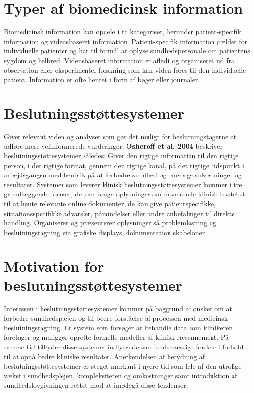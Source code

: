 \section{Typer af biomedicinsk information}
Biomedicinsk information kan opdele i to kategoriser, herunder patient-specifik information og vidensbaseret information. Patient-specifik information gælder for individuelle patienter og har til formål at oplyse sundhedspersonale om patientens sygdom og helbred. Vidensbaseret information er afledt og organiseret ud fra observation eller eksperimentel forskning som kan viden føres til den individuelle patient. Information er ofte hentet i form af bøger eller journaler.  

\section{Beslutningsstøttesystemer}
Giver relevant viden og analyser som gør det muligt for beslutningstagerne at udføre mere velinformerede vurderinger. \textbf{Osheroff et al. 2004} beskriver beslutningsstøttesystemer således: Giver den rigtige information til den rigtige person, i det rigtige format, gennem den rigtige kanal, på det rigtige tidspunkt i arbejdsgangen med henblik på at forbedre sundhed og omsorgsomkostninger og resultater. Systemer som leverer klinisk beslutningsstøttesystemer kommer i tre grundlæggende former, de kan bruge oplysninger om nuværende klinisk kontekst til at hente relevante online dokumenter, de kan give patientspecifikke, situationsspecifikke advarsler, påmindelser eller andre anbefalinger til direkte handling. Organiserer og præsenterer oplysninger så problemløsning og beslutningstagning via grafiske displays, dokumentation skabeloner. 

\section{Motivation for beslutningsstøttesystemer}
Interessen i beslutningsstøttesystemer kommer på baggrund af ønsket om at forbedre sundhedsplejen og til bedre forståelse af processen med medicinsk beslutningstagning. Et system som forsøger at behandle data som klinikeren foretager og muliggør oprette formelle modeller af klinisk ræsonnement. På samme tid tilbyder disse systemer indlysende samfundsmæssige fordele i forhold til at opnå bedre kliniske resultater. Anerkendelsen af betydning af beslutningsstøttesystemer er steget markant i nyere tid som føle af den utrolige vækst i sundhedsplejen, kompleksiteten og omkostninger samt introduktion af sundhedslovgivningen rettet mod at imødegå disse tendenser. 

